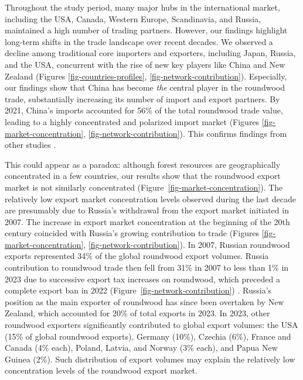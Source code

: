 \documentclass[
  authoryear,
  review,
  3p]{elsarticle}
\begin{document}
Throughout the study period, many major hubs in the international
market, including the USA, Canada, Western Europe, Scandinavia, and
Russia, maintained a high number of trading partners. However, our
findings highlight long-term shifts in the trade landscape over recent
decades. We observed a decline among traditional core importers and
exporters, including Japan, Russia, and the USA, concurrent with the
rise of new key players like China and New Zealand (Figures
\ref{fig-countries-profiles}, \ref{fig-network-contribution}).
Especially, our findings show that China has become \emph{the} central
player in the roundwood trade, substantially increasing its number of
import and export partners. By 2021, China's imports accounted for 56\%
of the total roundwood trade value, leading to a highly concentrated and
polarized import market (Figures \ref{fig-market-concentration},
\ref{fig-network-contribution}). This confirms findings from other
studies
\citep{ke_changes_2019, long_exploring_2019, zhou_spatial_2021, shen_structural_2022, huang_static_2024}.

This could appear as a paradox: although forest resources are
geographically concentrated in a few countries, our results show that
the roundwood export market is not similarly concentrated
(Figure~\ref{fig-market-concentration}). The relatively low export
market concentration levels observed during the last decade are
presumably due to Russia's withdrawal from the export market initiated
in 2007. The increase in export market concentration at the beginning of
the 20th century coincided with Russia's growing contribution to trade
(Figures \ref{fig-market-concentration},
\ref{fig-network-contribution}). In 2007, Russian roundwood exports
represented 34\% of the global roundwood export volumes. Russia
contribution to roundwood trade then fell from 31\% in 2007 to less than
1\% in 2023 due to successive export tax increases on roundwood, which
preceded a complete export ban in 2022
(Figure~\ref{fig-network-contribution})
\citep{lin_incidence_2017, unecefao_forest_2022, unecefao_forest_2022-1, fao_state_2024, guan_impact_2024}.
Russia's position as the main exporter of roundwood has since been
overtaken by New Zealand, which accounted for 20\% of total exports in
2023. In 2023, other roundwood exporters significantly contributed to
global export volumes: the USA (15\% of global roundwood exports),
Germany (10\%), Czechia (6\%), France and Canada (4\% each), Poland,
Latvia, and Norway (3\% each), and Papua New Guinea (2\%). Such
distribution of export volumes may explain the relatively low
concentration levels of the roundwood export market.
\end{document}
